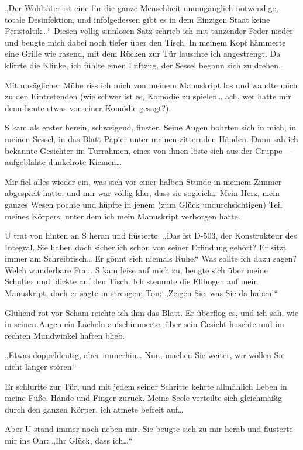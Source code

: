 „Der Wohltäter ist eine für die ganze Menschheit unumgänglich
notwendige, totale Desinfektion, und infolgedessen gibt es in dem
Einzigen Staat keine Peristaltik\ldots{}“ Diesen völlig sinnlosen Satz
schrieb ich mit tanzender Feder nieder und beugte mich dabei noch
tiefer über den Tisch. In meinem Kopf hämmerte eine Grille wie
rasend, mit dem Rücken zur Tür lauschte ich angestrengt. Da klirrte
die Klinke, ich fühlte einen Luftzug, der Sessel begann sich zu
drehen\ldots{}

Mit unsäglicher Mühe riss ich mich von meinem Manuskript los und
wandte mich zu den Eintretenden (wie schwer ist es, Komödie zu
spielen\ldots{} ach, wer hatte mir denn heute etwas von einer Komödie
gesagt?).

S kam als erster herein, schweigend, finster. Seine Augen
bohrten sich in mich, in meinen Sessel, in das Blatt Papier unter
meinen zitternden Händen. Dann sah ich bekannte Gesichter im
Türrahmen, eines von ihnen löste sich aus der Gruppe — aufgeblähte
dunkelrote Kiemen\ldots{}

Mir fiel alles wieder ein, was sich vor einer
halben Stunde in meinem Zimmer abgespielt hatte, und mir war völlig
klar, dass sie sogleich\ldots{} Mein Herz, mein ganzes Wesen pochte und
hüpfte in jenem (zum Glück undurchsichtigen) Teil meines Körpers,
unter dem ich mein Manuskript verborgen hatte.

U trat von hinten an S heran und flüsterte: „Das ist D-503, der
Konstrukteur des Integral. Sie haben doch sicherlich schon von
seiner Erfindung gehört? Er sitzt immer am Schreibtisch\ldots{} Er gönnt
sich niemals Ruhe.“ Was sollte ich dazu sagen? Welch wunderbare
Frau. S kam leise auf mich zu, beugte sich über meine Schulter und
blickte auf den Tisch. Ich stemmte die Ellbogen auf mein
Manuskript, doch er sagte in strengem Ton: „Zeigen Sie, was Sie da
haben!“

Glühend rot vor Scham reichte ich ihm das Blatt. Er überflog es,
und ich sah, wie in seinen Augen ein Lächeln aufschimmerte, über
sein Gesicht huschte und im rechten Mundwinkel haften blieb.

„Etwas doppeldeutig, aber immerhin\ldots{} Nun, machen Sie weiter, wir
wollen Sie nicht länger stören.“

Er schlurfte zur Tür, und mit
jedem seiner Schritte kehrte allmählich Leben in meine Füße, Hände
und Finger zurück. Meine Seele verteilte sich gleichmäßig durch den
ganzen Körper, ich atmete befreit auf\ldots{}

Aber U stand immer noch
neben mir. Sie beugte sich zu mir herab und flüsterte mir ins Ohr:
„Ihr Glück, dass ich\ldots{}“

